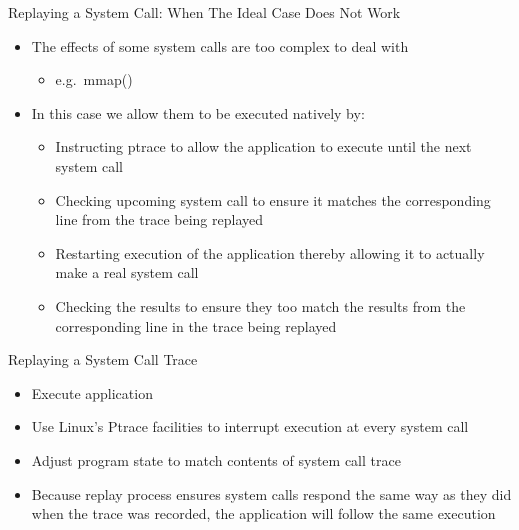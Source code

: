 \documentclass[pdf]{beamer}
\begin{document}
\begin{frame}{Replaying a System Call: When The Ideal Case Does Not Work}
  \begin{itemize}
  \item{The effects of some system calls are too complex to deal with}
    \begin{itemize}
    \item{e.g.\ mmap()}
    \end{itemize}
  \item{In this case we allow them to be executed natively by:}
    \begin{itemize}
      \item{Instructing ptrace to allow the application to execute until the
          next system call}
      \item{Checking upcoming system call to ensure it matches the corresponding
          line from the trace being replayed}
      \item{Restarting execution of the application thereby allowing it to
          actually make a real system call}
      \item{Checking the results to ensure they too match the results from the
          corresponding line in the trace being replayed}
    \end{itemize}
  \end{itemize}
\end{frame}


\begin{frame}{Replaying a System Call Trace}
  \begin{itemize}
  \item{Execute application}
  \item{Use Linux's Ptrace facilities to interrupt execution at every system
      call}
  \item{Adjust program state to match contents of system call trace}
  \item{Because replay process ensures system calls respond the same way as they
      did when the trace was recorded, the application will follow the same
      execution}
  \end{itemize}
\end{frame}
\end{document}
